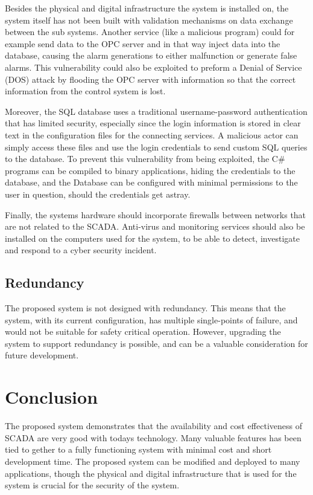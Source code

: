 \documentclass[conference]{IEEEtran}
\begin{document}
Besides the physical and digital infrastructure the system is installed on, the system itself has not been built with validation mechanisms on data exchange between the sub systems. Another service (like a malicious program) could for example send data to the OPC server and in that way inject data into the database, causing the alarm generations to either malfunction or generate false alarms. This vulnerability could also be exploited to preform a Denial of Service (DOS) attack by flooding the OPC server with information so that the correct information from the control system is lost.

Moreover, the SQL database uses a traditional username-password authentication that has limited security, especially since the login information is stored in clear text in the configuration files for the connecting services. A malicious actor can simply access these files and use the login credentials to send custom SQL queries to the database. To prevent this vulnerability from being exploited, the C\# programs can be compiled to binary applications, hiding the credentials to the database, and the Database can be configured with minimal permissions to the user in question, should the credentials get astray. 

Finally, the systems hardware should incorporate firewalls between networks that are not related to the SCADA. Anti-virus and monitoring services should also be installed on the computers used for the system, to be able to detect, investigate and respond to a cyber security incident.

\subsection{Redundancy}
The proposed system is not designed with redundancy. This means that the system, with its current configuration, has multiple single-points of failure, and would not be suitable for safety critical operation. However, upgrading the system to support redundancy is possible, and can be a valuable consideration for future development.


\section{Conclusion}
The proposed system demonstrates that the availability and cost effectiveness of SCADA are very good with todays technology. Many valuable features has been tied to gether to a fully functioning system with minimal cost and short development time. The proposed system can be modified and deployed to many applications, though the physical and digital infrastructure that is used for the system is crucial for the security of the system.



\end{document}
